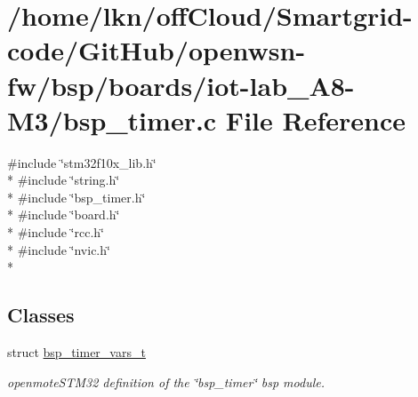 \hypertarget{iot-lab___a8-_m3_2bsp__timer_8c}{}\section{/home/lkn/off\+Cloud/\+Smartgrid-\/code/\+Git\+Hub/openwsn-\/fw/bsp/boards/iot-\/lab\+\_\+\+A8-\/\+M3/bsp\+\_\+timer.c File Reference}
\label{iot-lab___a8-_m3_2bsp__timer_8c}
{\ttfamily \#include \char`\"{}stm32f10x\+\_\+lib.\+h\char`\"{}}\\*
{\ttfamily \#include \char`\"{}string.\+h\char`\"{}}\\*
{\ttfamily \#include \char`\"{}bsp\+\_\+timer.\+h\char`\"{}}\\*
{\ttfamily \#include \char`\"{}board.\+h\char`\"{}}\\*
{\ttfamily \#include \char`\"{}rcc.\+h\char`\"{}}\\*
{\ttfamily \#include \char`\"{}nvic.\+h\char`\"{}}\\*
\subsection*{Classes}
\begin{DoxyCompactItemize}
\item 
struct \hyperlink{structbsp__timer__vars__t}{bsp\+\_\+timer\+\_\+vars\+\_\+t}
\begin{DoxyCompactList}\small\item\em openmote\+S\+T\+M32 definition of the \char`\"{}bsp\+\_\+timer\char`\"{} bsp module. \end{DoxyCompactList}\end{DoxyCompactItemize}
